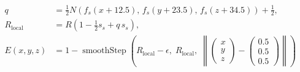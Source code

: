 \documentclass[border=6pt]{standalone}
\begin{document}
\color{white}
\(\displaystyle
\begin{aligned}
q &= \frac{1}{2}N\!\left(f_s(x+12.5),\,f_s(y+23.5),\,f_s(z+34.5)\right)+\frac{1}{2},\\
R_{\mathrm{local}} &= R\left(1-\frac{1}{2}s_s+q\,s_s\right),\\
E(x,y,z) &= 1-\operatorname{smoothStep}
\left(R_{\mathrm{local}}-\epsilon,\;R_{\mathrm{local}},\;
\left\|\begin{pmatrix}x\\y\\z\end{pmatrix}
-\begin{pmatrix}0.5\\0.5\\0.5\end{pmatrix}\right\|\right)
\end{aligned}
\)
\end{document}
